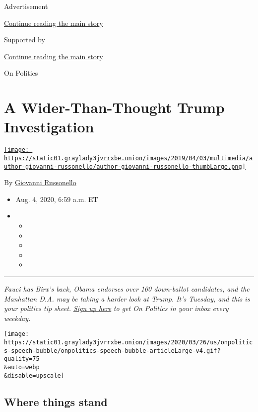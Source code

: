 Advertisement

\protect\hyperlink{after-top}{Continue reading the main story}

Supported by

\protect\hyperlink{after-sponsor}{Continue reading the main story}

On Politics

\hypertarget{a-wider-than-thought-trump-investigation}{%
\section{A Wider-Than-Thought Trump
Investigation}\label{a-wider-than-thought-trump-investigation}}

\href{https://www.nytimes3xbfgragh.onion/by/giovanni-russonello}{\texttt{[image: https://static01.graylady3jvrrxbe.onion/images/2019/04/03/multimedia/author-giovanni-russonello/author-giovanni-russonello-thumbLarge.png]}}

By
\href{https://www.nytimes3xbfgragh.onion/by/giovanni-russonello}{Giovanni
Russonello}

\begin{itemize}
\item
  Aug. 4, 2020, 6:59 a.m. ET
\item
  \begin{itemize}
  \item
  \item
  \item
  \item
  \item
  \end{itemize}
\end{itemize}

\begin{center}\rule{0.5\linewidth}{\linethickness}\end{center}

\emph{Fauci has Birx's back, Obama endorses over 100 down-ballot
candidates, and the Manhattan D.A. may be taking a harder look at Trump.
It's Tuesday, and this is your politics tip sheet.}
\href{https://www.nytimes3xbfgragh.onion/newsletters/politics?module=inline}{\emph{Sign
up here}} \emph{to get On Politics in your inbox every weekday.}

\texttt{[image: https://static01.graylady3jvrrxbe.onion/images/2020/03/26/us/onpolitics-speech-bubble/onpolitics-speech-bubble-articleLarge-v4.gif?quality=75\\\&auto=webp\\\&disable=upscale]}

\hypertarget{where-things-stand}{%
\subsection{Where things stand}\label{where-things-stand}}

